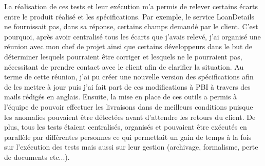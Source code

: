 	La réalisation de ces tests et leur exécution m'a permis de relever certains écarts entre le produit réalisé et les spécifications. Par exemple, le service LoanDetails ne fournissait pas, dans sa réponse, certains champs demandé par le client. C'est pourquoi, après avoir centralisé tous les écarts que j'avais relevé, j'ai organisé une réunion avec mon chef de projet ainsi que certains développeurs dans le but de déterminer lesquels pourraient être corriger et lesquels ne le pourraient pas, nécessitant de prendre contact avec le client afin de clarifier la situation. Au terme de cette réunion, j'ai pu créer une nouvelle version des spécifications afin de les mettre à jour puis j'ai fait part de ces modifications à PBI à travers des mails rédigés en anglais. Ensuite, la mise en place de ces outils a permis à l'équipe de pouvoir effectuer les livraisons dans de meilleurs conditions puisque les anomalies pouvaient être détectées avant d'attendre les retours du client. De plus, tous les tests étaient centralisés, organisés et pouvaient être exécutés en parallèle par différentes personnes ce qui permettait un gain de temps à la fois sur l'exécution des tests mais aussi sur leur gestion (archivage, formalisme, perte de documents etc...). \\
	
